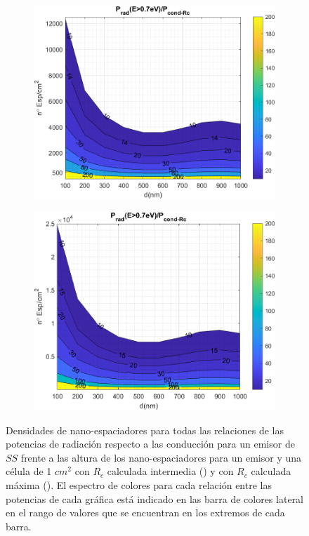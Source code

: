 \begin{figure}[H]
	\centering
	\begin{subfigure}[b]{0.49\textwidth}
		\centering
			\includegraphics[width=1.00\textwidth]{figuras/Resultados/RelacionCondRad/SS_Rc_Intermedio.png}
		\caption{ }
		\label{fig:rel_SsSiO2Ge_Rc_inter}
	\end{subfigure}
	\hfill	
	\begin{subfigure}[b]{0.49\textwidth}
		\centering
			\includegraphics[width=1.00\textwidth]{figuras/Resultados/RelacionCondRad/SS_Rc.png}
		\caption{ }
		\label{fig:rel_SsSiO2Ge_Rc_max}
	\end{subfigure}
	\caption{Densidades de nano-espaciadores para todas las relaciones de las potencias de radiación respecto a las conducción para un emisor de $SS$ frente a las altura de los nano-espaciadores para un emisor y una célula de 1 $cm^2$ con $R_c$ calculada intermedia () y con $R_c$ calculada máxima (). El espectro de colores para cada relación entre las potencias de cada gráfica está indicado en las barra de colores lateral en el rango de valores que se encuentran en los extremos de cada barra.}
	\label{fig:rels_SsSiO2Ge_Prc1vsPrc2}
\end{figure}
